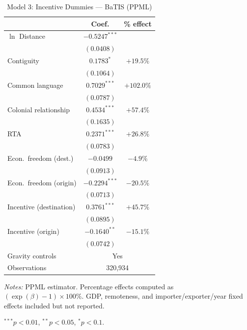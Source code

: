 \clearpage


\begin{table}[htbp]
\centering
\caption{Model 3: Incentive Dummies --- BaTIS (PPML)}
\label{tab:batis_model3}
\small
\begin{tabular}{l cc}
\toprule
 & Coef. & \% effect \\
\midrule
$\ln$ Distance & $-0.5247^{***}$ & \\
 & $(0.0408)$ & \\[4pt]
Contiguity & $0.1783^{*}$ & $+19.5\%$ \\
 & $(0.1064)$ & \\[4pt]
Common language & $0.7029^{***}$ & $+102.0\%$ \\
 & $(0.0787)$ & \\[4pt]
Colonial relationship & $0.4534^{***}$ & $+57.4\%$ \\
 & $(0.1635)$ & \\[4pt]
RTA & $0.2371^{***}$ & $+26.8\%$ \\
 & $(0.0783)$ & \\[4pt]
Econ.\ freedom (dest.) & $-0.0499$ & $-4.9\%$ \\
 & $(0.0913)$ & \\[4pt]
Econ.\ freedom (origin) & $-0.2294^{***}$ & $-20.5\%$ \\
 & $(0.0713)$ & \\[4pt]
Incentive (destination) & $0.3761^{***}$ & $+45.7\%$ \\
 & $(0.0895)$ & \\[4pt]
Incentive (origin) & $-0.1640^{**}$ & $-15.1\%$ \\
 & $(0.0742)$ & \\[4pt]
\midrule
Gravity controls & \multicolumn{2}{c}{Yes} \\
Observations & \multicolumn{2}{c}{320,934} \\
\bottomrule
\end{tabular}
\par\vspace{4pt}\noindent\begin{minipage}{\textwidth}
\footnotesize
\par \textit{Notes:} PPML estimator. Percentage effects computed as $(\exp(\beta)-1) \times 100\%$. GDP, remoteness, and importer/exporter/year fixed effects included but not reported.
\par $^{***}p<0.01$, $^{**}p<0.05$, $^{*}p<0.1$.
\end{minipage}
\end{table}

